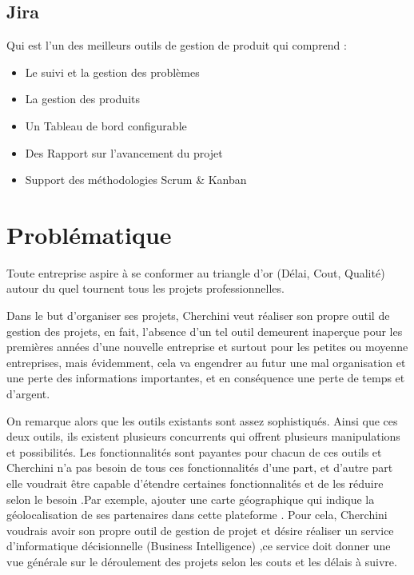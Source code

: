 \subsection{Jira}
Qui est l'un des meilleurs outils de gestion de produit qui comprend :
\begin{itemize}

\item{Le suivi et la gestion des probl\`{e}mes}

\item{La gestion des produits}

\item{Un Tableau de bord configurable}

\item{Des Rapport sur l'avancement du projet}

\item{Support des m\'{e}thodologies Scrum \& Kanban}

\end{itemize}



\section{ Probl\'{e}matique }
Toute entreprise aspire \`{a} se conformer au triangle d'or (D\'{e}lai, Cout, Qualit\'{e})
autour du quel tournent tous les projets professionnelles.




Dans le but d'organiser ses projets, Cherchini veut r\'{e}aliser son propre outil de
gestion des projets, en fait, l'absence d'un tel outil demeurent inaper\c{c}ue
pour les premi\`{e}res ann\'{e}es d'une nouvelle entreprise et surtout pour les
petites ou moyenne entreprises, mais \'{e}videmment, cela va engendrer au futur
une mal organisation et une perte des informations importantes, et en
cons\'{e}quence une perte de temps et d'argent.

On remarque alors que les outils existants sont assez sophistiqu\'{e}s.
Ainsi que ces deux outils, ils existent plusieurs concurrents qui offrent
plusieurs manipulations et possibilit\'{e}s.
Les fonctionnalit\'{e}s sont payantes pour chacun de ces outils et Cherchini n'a
pas besoin de tous ces fonctionnalit\'{e}s d'une part, et d'autre part elle voudrait
\^{e}tre capable d'\'{e}tendre certaines fonctionnalit\'{e}s et de les r\'{e}duire selon le
besoin .Par exemple, ajouter une carte g\'{e}ographique qui indique la
g\'{e}olocalisation de ses partenaires dans cette plateforme .
Pour cela, Cherchini voudrais avoir son propre outil de gestion de projet et d\'{e}sire r\'{e}aliser un
service d'informatique d\'{e}cisionnelle (Business Intelligence) ,ce service doit donner une vue g\'{e}n\'{e}rale sur le d\'{e}roulement des projets
selon les couts et les d\'{e}lais \`{a} suivre.


